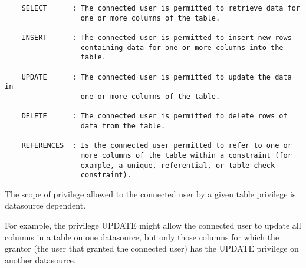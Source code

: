 \begin{verbatim}
    SELECT      : The connected user is permitted to retrieve data for 
                  one or more columns of the table.

    INSERT      : The connected user is permitted to insert new rows 
                  containing data for one or more columns into the 
                  table.

    UPDATE      : The connected user is permitted to update the data in 
                  one or more columns of the table.

    DELETE      : The connected user is permitted to delete rows of 
                  data from the table.

    REFERENCES  : Is the connected user permitted to refer to one or 
                  more columns of the table within a constraint (for 
                  example, a unique, referential, or table check 
                  constraint).
\end{verbatim}


The scope of privilege allowed to the connected user by a given table 
privilege is datasource dependent. 

For example, the privilege UPDATE might allow the connected user to update 
all columns in a table on one datasource, but only those columns for 
which the grantor (the user that granted the connected user) has the UPDATE 
privilege on another datasource.

